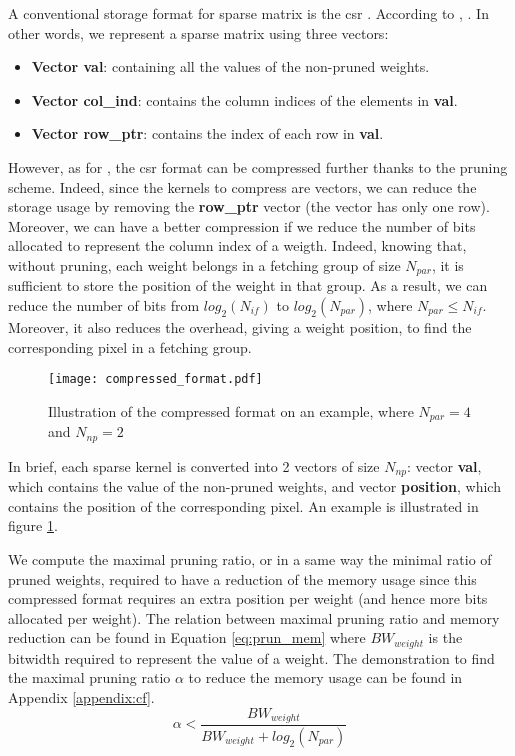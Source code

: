 A conventional storage format for sparse matrix is the \acrfull{csr} \cite{buluc_parallel_2009}. According to \textcite{buluc_parallel_2009}, . In other words, we represent a sparse matrix using three vectors:
%
\begin{itemize}
    \item \textbf{Vector val}: containing all the values of the non-pruned weights.
    \item \textbf{Vector col\_ind}: contains the column indices of the elements in \textbf{val}.
    \item \textbf{Vector row\_ptr}: contains the index of each row in \textbf{val}.
\end{itemize}
%
However, as for \cite{zhu_efficient_2020}, the \acrshort{csr} format can be compressed further thanks to the pruning scheme. Indeed, since the kernels to compress are vectors, we can reduce the storage usage by removing the \textbf{row\_ptr} vector (the vector has only one row). Moreover, we can have a better compression if we reduce the number of bits allocated to represent the column index of a weigth. Indeed, knowing that, without pruning, each weight belongs in a fetching group of size $N_{par}$, it is sufficient to store the position of the weight in that group. As a result, we can reduce the number of bits from $log_2(N_{if})$ to $log_2(N_{par})$, where $N_{par} \leq N_{if}$. Moreover, it also reduces the overhead, giving a weight position, to find the corresponding pixel in a fetching group.

\begin{figure}
    \centering
    \texttt{[image: compressed\_format.pdf]}
    \caption{Illustration of the compressed format on an example, where $N_{par} = 4$ and $N_{np} = 2$}
    \label{fig:compressed_format}
\end{figure}
%
In brief, each sparse kernel is converted into 2 vectors of size $N_{np}$: vector \textbf{val}, which contains the value of the non-pruned weights, and vector \textbf{position}, which contains the position of the corresponding pixel. An example is illustrated in figure \ref{fig:compressed_format}.

We compute the maximal pruning ratio, or in a same way the minimal ratio of pruned weights, required to have a reduction of the memory usage since this compressed format requires an extra position per weight (and hence more bits allocated per weight). The relation between maximal pruning ratio and memory reduction can be found in Equation \eqref{eq:prun_mem} where $BW_{weight}$ is the bitwidth required to represent the value of a weight. The demonstration to find the maximal pruning ratio $\alpha$ to reduce the memory usage can be found in Appendix \ref{appendix:cf}.
%
\begin{equation}
    \alpha < \frac{BW_{weight}}{ BW_{weight} + log_2(N_{par})}
    \label{eq:prun_mem}
\end{equation}

